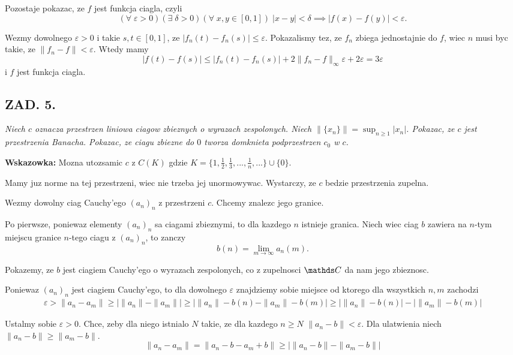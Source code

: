 \documentclass{article}
\begin{document}
    Pozostaje pokazac, ze $f$ jest funkcja ciagla, czyli
    $$(\forall\;\varepsilon>0)(\exists\;\delta>0)(\forall\;x,y\in[0,1])\;|x-y|<\delta\implies|f(x)-f(y)|<\varepsilon.$$

    Wezmy dowolnego $\varepsilon>0$ i takie $s,t\in[0,1]$, ze $|f_n(t)-f_n(s)|\leq \varepsilon$. Pokazalismy tez, ze $f_n$ zbiega jednostajnie do $f$, wiec $n$ musi byc takie, ze $\|f_n-f\|<\varepsilon$. Wtedy mamy
    $$|f(t)-f(s)|\leq |f_n(t)-f_n(s)|+2\|f_n-f\|_\infty\varepsilon+2\varepsilon=3\varepsilon$$
    i $f$ jest funkcja ciagla.

    \subsection*{ZAD. 5.}

    \emph{
        Niech $c$ oznacza przestrzen liniowa ciagow zbieznych o wyrazach zespolonych. Niech $\|\{x_n\}\|=\sup_{n\geq1}|x_n|$. Pokazac, ze $c$ jest przestrzenia Banacha. Pokazac, ze ciagu zbiezne do $0$ tworza domknieta podprzestrzen $c_0$ w $c$.
    }

    \textbf{Wskazowka:} Mozna utozsamic $c$ z $C(K)$ gdzie $K=\{1,\frac12,\frac13,...,\frac1n,...\}\cup\{0\}$.
    \bigskip

    \bigskip

    Mamy juz norme na tej przestrzeni, wiec nie trzeba jej unormowywac. Wystarczy, ze $c$ bedzie przestrzenia zupelna.
    \medskip

    Wezmy dowolny ciag Cauchy'ego $(a_n)_n$ z przestrzeni $c$. Chcemy znalezc jego granice.

    Po pierwsze, poniewaz elementy $(a_n)_n$ sa ciagami zbieznymi, to dla kazdego $n$ istnieje granica. Niech wiec ciag $b$ zawiera na $n$-tym miejscu granice $n$-tego ciagu z $(a_n)_n$, to zanczy
    $$b(n)=\lim_{m\to\infty}a_n(m).$$

    Pokazemy, ze $b$ jest ciagiem Cauchy'ego o wyrazach zespolonych, co z zupelnosci $\C$ da nam jego zbieznosc.

    Poniewaz $(a_n)_n$ jest ciagiem Cauchy'ego, to dla dowolnego $\varepsilon$ znajdziemy sobie miejsce od ktorego dla wszystkich $n,m$ zachodzi
    \begin{align*}
        \varepsilon>\|a_n-a_m\|\geq |\|a_n\|-\|a_m\||\geq |\|a_n\|-b(n)-\|a_m\|-b(m)|\geq |\|a_n\|-b(n)|-|\|a_m\|-b(m)|
    \end{align*}

    Ustalmy sobie $\varepsilon>0$. Chce, zeby dla niego istnialo $N$ takie, ze dla kazdego $n\geq N$ $\|a_n-b\|<\varepsilon$. Dla ulatwienia niech $\|a_n-b\|\geq\|a_m-b\|$.
    $$\|a_n-a_m\|=\|a_n-b-a_m+b\|\geq |\|a_n-b\|-\|a_m-b\||$$
\end{document}
